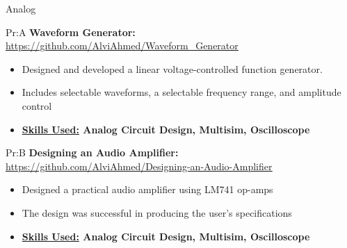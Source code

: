 Analog


Pr:A
\vspace{\spaces}
\textbf{Waveform Generator: }
\underline{\url{https://github.com/AlviAhmed/Waveform_Generator}}
\begin{itemize}[noitemsep,nolistsep]
\item Designed and developed a linear voltage-controlled function generator. 
\item Includes selectable waveforms, a selectable frequency range, and amplitude control
\item \textbf{ \underline{Skills Used:} Analog Circuit Design, Multisim, Oscilloscope}
\end{itemize}            


Pr:B
\vspace{\spaces}
\textbf{Designing an Audio Amplifier: }
\underline{\url{https://github.com/AlviAhmed/Designing-an-Audio-Amplifier}}
\begin{itemize}[noitemsep,nolistsep]
\item Designed a practical audio amplifier using LM741 op-amps
\item The design was successful in producing the user's specifications
\item \textbf{ \underline{Skills Used:} Analog Circuit Design, Multisim, Oscilloscope}
\end{itemize}

